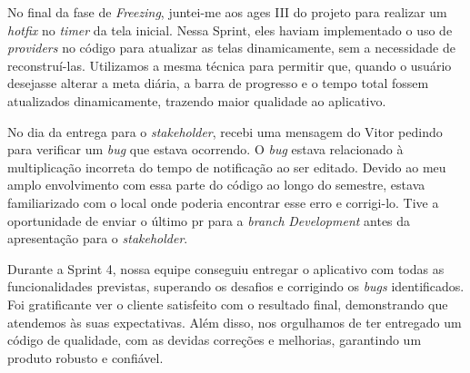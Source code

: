 No final da fase de \textit{Freezing}, juntei-me aos \ac{ages} III do projeto para realizar um \textit{hotfix} no \textit{timer} da tela inicial. Nessa Sprint, eles haviam implementado o uso de \textit{providers} no código para atualizar as telas dinamicamente, sem a necessidade de reconstruí-las. Utilizamos a mesma técnica para permitir que, quando o usuário desejasse alterar a meta diária, a barra de progresso e o tempo total fossem atualizados dinamicamente, trazendo maior qualidade ao aplicativo.

No dia da entrega para o \textit{stakeholder}, recebi uma mensagem do Vitor pedindo para verificar um \textit{bug} que estava ocorrendo. O \textit{bug} estava relacionado à multiplicação incorreta do tempo de notificação ao ser editado. Devido ao meu amplo envolvimento com essa parte do código ao longo do semestre, estava familiarizado com o local onde poderia encontrar esse erro e corrigi-lo. Tive a oportunidade de enviar o último \ac{pr} para a \textit{branch} \textit{Development} antes da apresentação para o \textit{stakeholder}.

Durante a Sprint 4, nossa equipe conseguiu entregar o aplicativo com todas as funcionalidades previstas, superando os desafios e corrigindo os \textit{bugs} identificados. Foi gratificante ver o cliente satisfeito com o resultado final, demonstrando que atendemos às suas expectativas. Além disso, nos orgulhamos de ter entregado um código de qualidade, com as devidas correções e melhorias, garantindo um produto robusto e confiável.